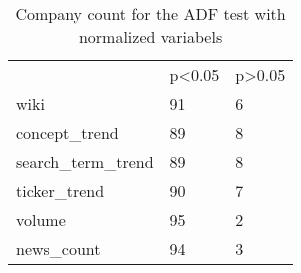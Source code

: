 \begin{table}[]
\caption{Company count for the ADF test with normalized variabels} \label{tab:ADF_counts} 
\centering
\begin{tabular}{lll}
\hline
 & p\textless{}0.05 & p\textgreater{}0.05 \\
wiki & 91 & 6 \\
concept\_trend & 89 & 8 \\
search\_term\_trend & 89 & 8 \\
ticker\_trend & 90 & 7 \\
volume & 95 & 2 \\
news\_count & 94 & 3 \\ \hline
\end{tabular}
\end{table}






